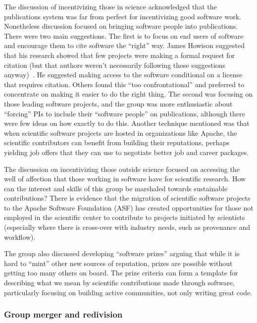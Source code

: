 \documentclass[11pt, oneside]{amsart}
\begin{document}
The discussion of incentivizing those in science acknowledged that the
publications system was far from perfect for incentivizing good software work.
Nonetheless discussion focused on bringing software people into publications.
There were two main suggestions. The first is to focus on end users of software
and encourage them to cite software the ``right'' way. James Howison suggested
that his research showed that few projects were making a formal request for
citation (but that authors weren't necessarily following those suggestions
anyway)~\cite{howison2015jasist}. He suggested making access to the software
conditional on a license that requires citation. Others found this ``too
confrontational'' and preferred to concentrate on making it easier to do the
right thing. The second was focusing on those leading software projects, and the
group was more enthusiastic about ``forcing'' PIs to include their ``software
people'' on publications, although there were few ideas on how exactly to do
this. Another technique mentioned was that when scientific software projects are
hosted in organizations like Apache, the scientific contributors can benefit
from building their reputations, perhaps yielding job offers that they can use
to negotiate better job and career packages.

The discussion on incentivizing those outside science focused on accessing the
well of affection that those working in software have for scientific research.
How can the interest and skills of this group be marshaled towards sustainable
contributions? There is evidence that the migration of scientific software
projects to the Apache Software Foundation (ASF) has created opportunities for those not
employed in the scientific center to contribute to projects initiated by
scientists (especially where there is cross-over with industry needs, such as
provenance and workflow).

The group also discussed developing ``software prizes'' arguing that while it is
hard to ``mint'' other new sources of reputation, prizes are possible without
getting too many others on board. The prize criteria can form a template for
describing what we mean by scientific contributions made through software,
particularly focusing on building active communities, not only writing great
code.

\subsubsection{Group merger and redivision}
\end{document}
